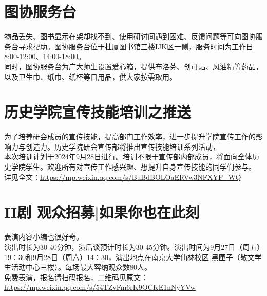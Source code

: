\documentclass[letterpaper, 12pt]{article}
\begin{document}
\begin{multicols}{2}
\section{图协服务台}
物品丢失、图书显示在架却找不到、使用研讨间遇到困难、反馈问题等可向图协服务台寻求帮助。图协服务台位于杜厦图书馆三楼IJK区一侧，服务时间为工作日8:00-12:00、14:00-18:00。\\
同时，图协服务台为广大师生设置爱心箱，提供布洛芬、创可贴、风油精等药品，以及卫生巾、纸巾、纸杯等日用品，供大家按需取用。
\section{历史学院宣传技能培训之推送}
为了培养研会成员的宣传技能，提高部门工作效率，进一步提升学院宣传工作的影响力与创造力。历史学院研会宣传部将推出宣传技能培训系列活动，\\
本次培训计划于2024年9月28日进行。培训不限于宣传部内部成员，将面向全体历史学院学生。欢迎所有对宣传工作感兴趣、想提升自身宣传技能的同学们参与。\\
详见全文：\url{https://mp.weixin.qq.com/s/BuBdBOLOaERVw3NFXYF_WQ}

\section{II剧 观众招募|如果你也在此刻}
表演内容小编也很好奇。\\
演出时长为30-40分钟，演后谈预计时长为30-45分钟。演出时间为9月27日（周五）19：30和9月28日（周六）14：30，演出地点在南京大学仙林校区-黑匣子（敬文学生活动中心三楼）。每场最大容纳观众数80人。\\
免费表演，报名请扫码报名，二维码见原文：\url{https://mp.weixin.qq.com/s/54TZvFm6rK9OCKE1nNyYVw}




\end{multicols} 
\end{document}
